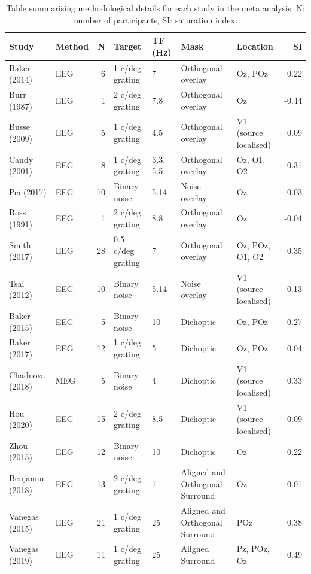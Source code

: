 \documentclass[]{article}
\begin{document}
\begin{table}

\caption{\label{tab:metatable}Table summarising methodological details for each study in the meta analysis. N: number of participants, SI: saturation index.}
\centering
\begin{tabular}[t]{l|l|r|l|l|l|l|r}
\hline
Study & Method & N & Target & TF (Hz) & Mask & Location & SI\\
\hline
Baker (2014) & EEG & 6 & 1 c/deg grating & 7 & Orthogonal overlay & Oz, POz & 0.22\\
\hline
Burr (1987) & EEG & 1 & 2 c/deg grating & 7.8 & Orthogonal overlay & Oz & -0.44\\
\hline
Busse (2009) & EEG & 5 & 1 c/deg grating & 4.5 & Orthogonal overlay & V1 (source localised) & 0.09\\
\hline
Candy (2001) & EEG & 8 & 1 c/deg grating & 3.3, 5.5 & Orthogonal overlay & Oz, O1, O2 & 0.31\\
\hline
Pei (2017) & EEG & 10 & Binary noise & 5.14 & Noise overlay & Oz & -0.03\\
\hline
Ross (1991) & EEG & 1 & 2 c/deg grating & 8.8 & Orthogonal overlay & Oz & -0.04\\
\hline
Smith (2017) & EEG & 28 & 0.5 c/deg grating & 7 & Orthogonal overlay & Oz, POz, O1, O2 & 0.35\\
\hline
Tsai (2012) & EEG & 10 & Binary noise & 5.14 & Noise overlay & V1 (source localised) & -0.13\\
\hline
Baker (2015) & EEG & 5 & Binary noise & 10 & Dichoptic & Oz, POz & 0.27\\
\hline
Baker (2017) & EEG & 12 & 1 c/deg grating & 5 & Dichoptic & Oz, POz & 0.04\\
\hline
Chadnova (2018) & MEG & 5 & Binary noise & 4 & Dichoptic & V1 (source localised) & 0.33\\
\hline
Hou (2020) & EEG & 15 & 2 c/deg grating & 8.5 & Dichoptic & V1 (source localised) & 0.09\\
\hline
Zhou (2015) & EEG & 12 & Binary noise & 10 & Dichoptic & Oz & 0.22\\
\hline
Benjamin (2018) & EEG & 13 & 2 c/deg grating & 7 & Aligned and Orthogonal Surround & Oz & -0.01\\
\hline
Vanegas (2015) & EEG & 21 & 1 c/deg grating & 25 & Aligned and Orthogonal Surround & POz & 0.38\\
\hline
Vanegas (2019) & EEG & 11 & 1 c/deg grating & 25 & Aligned Surround & Pz, POz, Oz & 0.49\\
\hline
\end{tabular}
\end{table}
\end{document}
